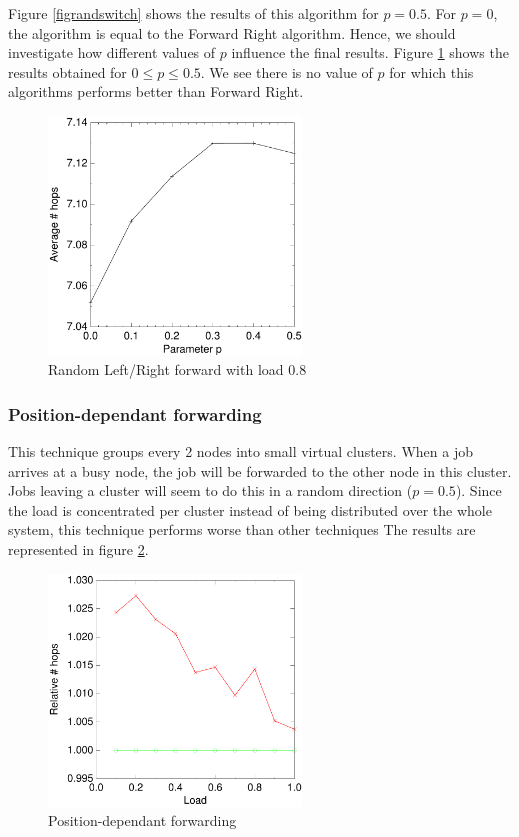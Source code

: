 \documentclass[10pt,a4paper]{article}
\begin{document}
Figure \ref{figrandswitch} shows the results of this algorithm for $p=0.5$. For $p=0$, the algorithm is equal to the Forward Right algorithm. Hence, we should investigate how different values of $p$ influence the final results. Figure \ref{figrandswitchp} shows the results obtained for $0 \leq p \leq 0.5$. We see there is no value of $p$ for which this algorithms performs better than Forward Right.

\begin{figure}[h!tb]
\centering
\includegraphics[width=0.6\textwidth]{data/randswitchp.pdf}
\caption{Random Left/Right forward with load $0.8$}
\label{figrandswitchp}
\end{figure}

\subsubsection*{Position-dependant forwarding}
This technique groups every 2 nodes into small virtual clusters. When a job arrives at a busy node, the job will be forwarded to the other node in this cluster. Jobs leaving a cluster will seem to do this in a random direction ($p=0.5$). Since the load is concentrated per cluster instead of being distributed over the whole system, this technique performs worse than other techniques The results are represented in figure \ref{figevenswitch}.

\begin{figure}[h!tb]
\centering
\includegraphics[width=0.6\textwidth]{data/evenswitchright.pdf}
\caption{Position-dependant forwarding}
\label{figevenswitch}
\end{figure}
\end{document}
